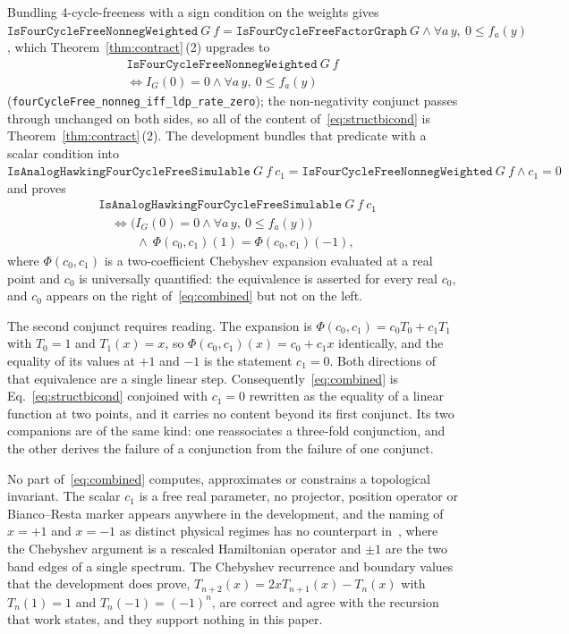 \documentclass[aps,prx,reprint,nofootinbib,floatfix]{revtex4-2}
\begin{document}
Bundling 4-cycle-freeness with a sign condition on the weights gives
$\texttt{IsFourCycleFreeNonnegWeighted}\ G\ f =
\texttt{IsFourCycleFreeFactorGraph}\ G \wedge \forall a\,y,\ 0 \leq f_a(y)$,
which Theorem~\ref{thm:contract}\,(2) upgrades to
\begin{equation}
\label{eq:structbicond}
\begin{gathered}
\texttt{IsFourCycleFreeNonnegWeighted}\ G\ f\\
\iff I_G(0) = 0 \wedge \forall a\,y,\ 0 \leq f_a(y)
\end{gathered}
\end{equation}
(\texttt{fourCycleFree\_nonneg\_iff\_ldp\_rate\_zero}); the non-negativity
conjunct passes through unchanged on both sides, so all of the content
of~\eqref{eq:structbicond} is Theorem~\ref{thm:contract}\,(2). The development
bundles that predicate with a scalar condition into
$\texttt{IsAnalogHawkingFourCycleFreeSimulable}\ G\ f\ c_1 =
\texttt{IsFourCycleFreeNonnegWeighted}\ G\ f \wedge c_1 = 0$
and proves
\begin{equation}
\label{eq:combined}
\begin{split}
&\texttt{IsAnalogHawkingFourCycleFreeSimulable}\ G\ f\ c_1 \\
&\quad\iff \bigl(I_G(0) = 0 \wedge \forall a\,y,\ 0 \leq f_a(y)\bigr) \\
&\quad\qquad \wedge\ \Phi(c_0,c_1)(1) = \Phi(c_0,c_1)(-1),
\end{split}
\end{equation}
where $\Phi(c_0,c_1)$ is a two-coefficient Chebyshev expansion evaluated at a
real point and $c_0$ is universally quantified: the equivalence is asserted for
every real $c_0$, and $c_0$ appears on the right of~\eqref{eq:combined} but not
on the left.

The second conjunct requires reading. The expansion is
$\Phi(c_0,c_1) = c_0 T_0 + c_1 T_1$ with $T_0 = 1$ and $T_1(x) = x$, so
$\Phi(c_0,c_1)(x) = c_0 + c_1 x$ identically, and the equality of its values at
$+1$ and $-1$ is the statement $c_1 = 0$. Both directions of that equivalence
are a single linear step. Consequently~\eqref{eq:combined} is
Eq.~\eqref{eq:structbicond} conjoined with $c_1 = 0$ rewritten as the equality
of a linear function at two points, and it carries no content beyond its first
conjunct. Its two companions are of the same kind: one reassociates a
three-fold conjunction, and the other derives the failure of a conjunction from
the failure of one conjunct.

No part of~\eqref{eq:combined} computes, approximates or constrains a
topological invariant. The scalar $c_1$ is a free real parameter, no
projector, position operator or Bianco--Resta marker appears anywhere in the
development, and the naming of $x = +1$ and $x = -1$ as distinct physical
regimes has no counterpart in~\cite{AntaoSunFumegaLado2026PRL136}, where the
Chebyshev argument is a rescaled Hamiltonian operator and $\pm 1$ are the two
band edges of a single spectrum. The Chebyshev recurrence and boundary values
that the development does prove, $T_{n+2}(x) = 2xT_{n+1}(x) - T_n(x)$ with
$T_n(1) = 1$ and $T_n(-1) = (-1)^n$, are correct and agree with the recursion
that work states, and they support nothing in this paper.
\end{document}
